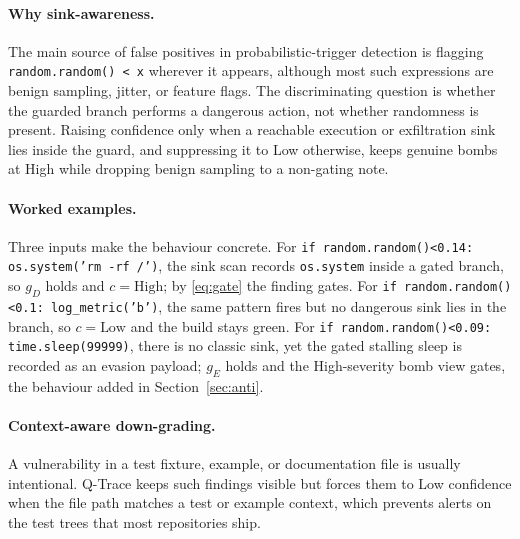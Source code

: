 \documentclass[runningheads]{llncs}
\begin{document}
\paragraph{Why sink-awareness.}
The main source of false positives in probabilistic-trigger detection is flagging
\texttt{random.random() < x} wherever it appears, although most such expressions
are benign sampling, jitter, or feature flags. The discriminating question is
whether the guarded branch performs a dangerous action, not whether randomness is
present. Raising confidence only when a reachable execution or exfiltration sink
lies inside the guard, and suppressing it to Low otherwise, keeps genuine bombs at
High while dropping benign sampling to a non-gating note.

\paragraph{Worked examples.}
Three inputs make the behaviour concrete. For
\texttt{if random.random()<0.14: os.system('rm -rf /')}, the sink scan records
\texttt{os.system} inside a gated branch, so $g_D$ holds and $c = \text{High}$; by
\eqref{eq:gate} the finding gates. For
\texttt{if random.random()<0.1: log\_metric('b')}, the same pattern fires but no
dangerous sink lies in the branch, so $c = \text{Low}$ and the build stays green.
For \texttt{if random.random()<0.09: time.sleep(99999)}, there is no classic sink,
yet the gated stalling sleep is recorded as an evasion payload; $g_E$ holds and the
High-severity bomb view gates, the behaviour added in Section~\ref{sec:anti}.

\paragraph{Context-aware down-grading.}
A vulnerability in a test fixture, example, or documentation file is usually
intentional. Q-Trace keeps such findings visible but forces them to Low confidence
when the file path matches a test or example context, which prevents alerts on the
test trees that most repositories ship.
\end{document}
